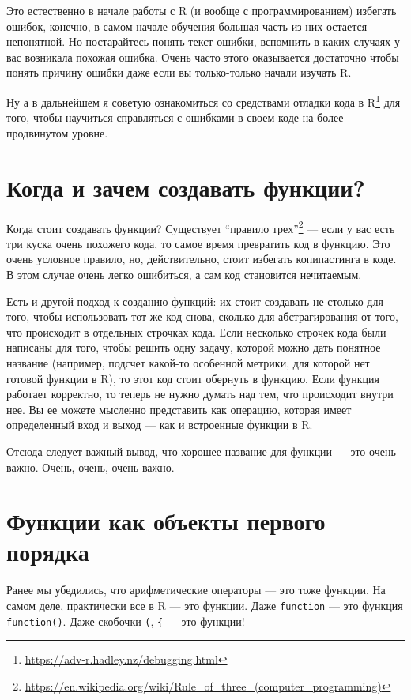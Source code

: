 \documentclass[
]{book}
\renewcommand{\href}[2]{#2\footnote{\url{#1}}}
\begin{document}
Это естественно в начале работы с R (и вообще с программированием) избегать ошибок, конечно, в самом начале обучения большая часть из них остается непонятной. Но постарайтесь понять текст ошибки, вспомнить в каких случаях у вас возникала похожая ошибка. Очень часто этого оказывается достаточно чтобы понять причину ошибки даже если вы только-только начали изучать R.

Ну а в дальнейшем я советую ознакомиться со \href{https://adv-r.hadley.nz/debugging.html}{средствами отладки кода в R} для того, чтобы научиться справляться с ошибками в своем коде на более продвинутом уровне.

\hypertarget{why_functions}{%
\section{Когда и зачем создавать функции?}\label{why_functions}}

Когда стоит создавать функции? Существует \href{https://en.wikipedia.org/wiki/Rule_of_three_(computer_programming)}{``правило трех''} --- если у вас есть три куска очень похожего кода, то самое время превратить код в функцию. Это очень условное правило, но, действительно, стоит избегать копипастинга в коде. В этом случае очень легко ошибиться, а сам код становится нечитаемым.

Есть и другой подход к созданию функций: их стоит создавать не столько для того, чтобы использовать тот же код снова, сколько для абстрагирования от того, что происходит в отдельных строчках кода. Если несколько строчек кода были написаны для того, чтобы решить одну задачу, которой можно дать понятное название (например, подсчет какой-то особенной метрики, для которой нет готовой функции в R), то этот код стоит обернуть в функцию. Если функция работает корректно, то теперь не нужно думать над тем, что происходит внутри нее. Вы ее можете мысленно представить как операцию, которая имеет определенный вход и выход --- как и встроенные функции в R.

Отсюда следует важный вывод, что хорошее название для функции --- это очень важно. Очень, очень, очень важно.

\hypertarget{functions_objects}{%
\section{Функции как объекты первого порядка}\label{functions_objects}}

Ранее мы убедились, что арифметические операторы --- это тоже функции. На самом деле, практически все в R --- это функции. Даже \texttt{function} --- это функция \texttt{function()}. Даже скобочки \texttt{(}, \texttt{\{} --- это функции!
\end{document}
